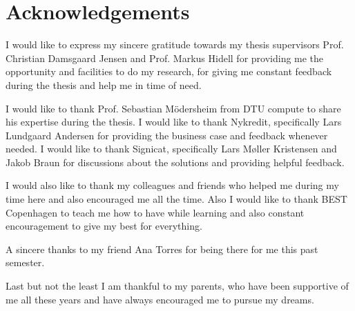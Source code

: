 \chapter{Acknowledgements}

I would like to express my sincere gratitude towards my thesis supervisors Prof. Christian Damsgaard Jensen and Prof. Markus Hidell for providing me the opportunity and facilities to do my research, for giving me constant feedback during the thesis and help me in time of need.

I would like to thank Prof. Sebastian Mödersheim from DTU compute to share his expertise during the thesis. I would like to thank Nykredit, specifically Lars Lundgaard Andersen for providing the business case and feedback whenever needed. I would like to thank Signicat, specifically Lars Møller Kristensen and Jakob Braun for discussions about the solutions and providing helpful feedback.

I would also like to thank my colleagues and friends who helped me during my time here and also encouraged me all the time. Also I would like to thank BEST Copenhagen to teach me how to have while learning and also constant encouragement to give my best for everything.

A sincere thanks to my friend Ana Torres for being there for me this past semester.

Last but not the least I am thankful to my parents, who have been supportive of me all these years and have always encouraged me to pursue my dreams.